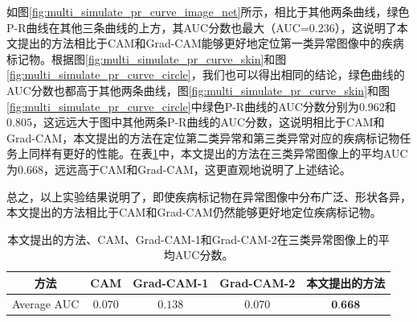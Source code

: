 如图\ref{fig:multi_simulate_pr_curve_image_net}所示，相比于其他两条曲线，绿色P-R曲线在其他三条曲线的上方，其AUC分数也最大（AUC=$0.236$），这说明了本文提出的方法相比于CAM和Grad-CAM能够更好地定位第一类异常图像中的疾病标记物。根据图\ref{fig:multi_simulate_pr_curve_skin}和图\ref{fig:multi_simulate_pr_curve_circle}，我们也可以得出相同的结论，绿色曲线的AUC分数也都高于其他两条曲线，图\ref{fig:multi_simulate_pr_curve_skin}和图\ref{fig:multi_simulate_pr_curve_circle}中绿色P-R曲线的AUC分数分别为$0.962$和$0.805$，这远远大于图中其他两条P-R曲线的AUC分数，这说明相比于CAM和Grad-CAM，本文提出的方法在定位第二类异常和第三类异常对应的疾病标记物任务上同样有更好的性能。在表\ref{tab:multi_ds_auc_scores}中，本文提出的方法在三类异常图像上的平均AUC为$0.668$，远远高于CAM和Grad-CAM，这更直观地说明了上述结论。

总之，以上实验结果说明了，即使疾病标记物在异常图像中分布广泛、形状各异，本文提出的方法相比于CAM和Grad-CAM仍然能够更好地定位疾病标记物。
\begin{table}[!htbp]
	\centering
	\caption[三种疾病标记物定位方法在三类异常图像上的平均AUC分数]{本文提出的方法、CAM、Grad-CAM-1和Grad-CAM-2在三类异常图像上的平均AUC分数。}
	\label{tab:multi_ds_auc_scores}
	\begin{tabular}{c|c|c|c|c}
		\toprule[2pt]
		方法 & CAM & Grad-CAM-1 & Grad-CAM-2 & 本文提出的方法 \\
		\midrule[2pt]
		Average AUC & $0.070$ & $0.138$ & $0.070$ & $\textbf{0.668}$ \\
		\bottomrule[2pt]
	\end{tabular}
\end{table}
\vspace{-0.7cm}
